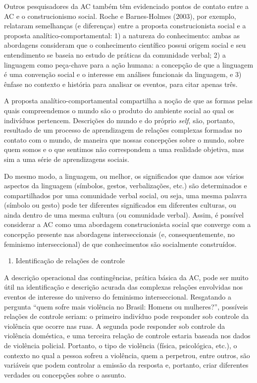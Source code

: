 Outros pesquisadores da AC também têm evidenciado pontos de contato entre a AC e o construcionismo social. Roche e Barnes-Holmes (2003), por exemplo, relataram semelhanças (e diferenças) entre a proposta construcionista social e a proposta analítico-comportamental: 1) a natureza do conhecimento: ambas as abordagens consideram que o conhecimento científico possui origem social e seu entendimento se baseia no estudo de práticas da comunidade verbal; 2) a linguagem como peça-chave para a ação humana: a concepção de que a linguagem é uma convenção social e o interesse em análises funcionais da linguagem, e 3) ênfase no contexto e história para analisar os eventos, para citar apenas três. 

A proposta analítico-comportamental compartilha a noção de que as formas pelas quais compreendemos o mundo são o produto do ambiente social ao qual os indivíduos pertencem. Descrições do mundo e do próprio \textit{self}, são, portanto, resultado de um processo de aprendizagem de relações complexas formadas no contato com o mundo, de maneira que nossas concepções sobre o mundo, sobre quem somos e o que sentimos não correspondem a uma realidade objetiva, mas sim a uma série de aprendizagens sociais. 

Do mesmo modo, a linguagem, ou melhor, os significados que damos aos vários aspectos da linguagem (símbolos, gestos, verbalizações, etc.) são determinados e compartilhados por uma comunidade verbal social, ou seja, uma mesma palavra (símbolo ou gesto) pode ter diferentes significados em diferentes culturas, ou ainda dentro de uma mesma cultura (ou comunidade verbal). Assim, é possível considerar a AC como uma abordagem construcionista social que converge com a concepção presente nas abordagens interseccionais (e, consequentemente, no feminismo interseccional) de que conhecimentos são socialmente construídos. 

\begin{enumerate}[resume]
    \item Identificação de relações de controle
\end{enumerate}

A descrição operacional das contingências, prática básica da AC, pode ser muito útil na identificação e descrição acurada das complexas relações envolvidas nos eventos de interesse do universo do feminismo interseccional. Resgatando a pergunta ``quem sofre mais violência no Brasil: Homens ou mulheres?'', possíveis relações de controle seriam: o primeiro indivíduo pode responder sob controle da violência que ocorre nas ruas. A segunda pode responder sob controle da violência doméstica, e uma terceira relação de controle estaria baseada nos dados de violência policial. Portanto, o tipo de violência (física, psicológica, etc.), o contexto no qual a pessoa sofreu a violência, quem a perpetrou, entre outros, são variáveis que podem controlar a emissão da resposta e, portanto, criar diferentes verdades ou concepções sobre o assunto.

